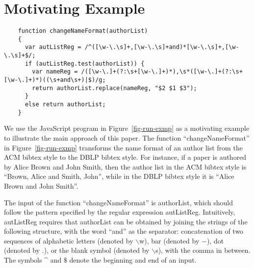 
\section{Motivating Example}\label{sec:mot}

\begin{figure*}[htbp]
\begin{center}
{
\begin{verbatim}
    function changeNameFormat(authorList)
    {
      var autListReg = /^([\w-\.\s]+,[\w-\.\s]+and)*[\w-\.\s]+,[\w-\.\s]+$/;
      if (autListReg.test(authorList)) {
        var nameReg = /([\w-\.]+(?:\s+[\w-\.]+)*),\s*([\w-\.]+(?:\s+[\w-\.]+)*)((\s+and\s+)|$)/g;
        return authorList.replace(nameReg, "$2 $1 $3");
      }
      else return authorList;
    }
\end{verbatim}
}
\end{center}
\caption{Change the name format of an author list: A motivating example}
\label{fig-run-exmp}
\end{figure*}


We use the JavaScript program in Figure~\ref{fig-run-exmp} as a motivating example to illustrate the main approach of this paper. 
The function ``changeNameFormat''  in Figure~\ref{fig-run-exmp} transforms the name format of an author list from the ACM bibtex style to the DBLP bibtex style. For instance,  if a paper is authored by Alice Brown and John Smith, then the author list in the ACM bibtex style is ``Brown, Alice and Smith, John'', while  in the DBLP bibtex style it is ``Alice Brown and John Smith''. 

The input of the function ``changeNameFormat'' is {\sf authorList}, which should follow the pattern specified by the regular expression {\sf autListReg}. Intuitively, {\sf autListReg} requires that {\sf authorList} can be obtained by joining the strings of the following structure, with the word ``and'' as the separator: concatenation of two sequences of alphabetic letters (denoted by $\backslash$w), bar (denoted by $-$), dot (denoted by $.$), or the blank symbol (denoted by $\backslash$s), with the comma in between. The symbols \^{} and $\$$ denote the beginning and end of an input.


